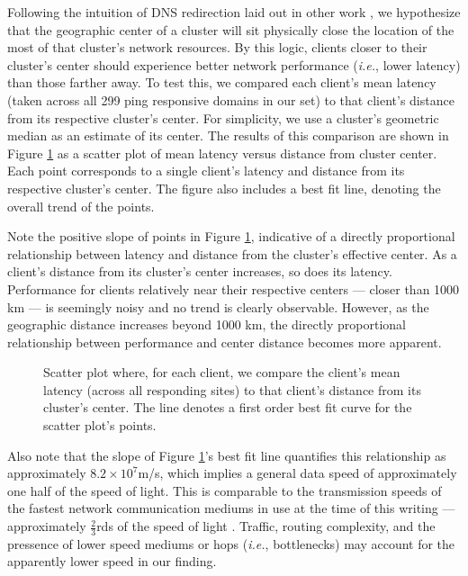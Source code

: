 \begin{figure*}
    \caption{Map of world with point for each cluster's geographic center.}
    \label{centerlocs}
\end{figure*}


Following the intuition of DNS redirection laid out in other work
\cite{Calder2013,exploringedns,benchaita2016stability}, we hypothesize that the
geographic center of a cluster will sit physically close the location of the
most of that cluster's network resources. By this logic, clients closer to
their cluster's center should experience better network performance
(\emph{i.e.}, lower latency) than those farther away. To test this, we compared
each client's mean latency (taken across all 299 ping responsive domains in our
set) to that client's distance from its respective cluster's center. For
simplicity, we use a cluster's geometric median as an estimate of its center.
The results of this comparison are shown in Figure \ref{geoperf} as a scatter
plot of mean latency versus distance from cluster center. Each point
corresponds to a single client's latency and distance from its respective
cluster's center.  The figure also includes a best fit line, denoting the
overall trend of the points. 

Note the positive slope of points in Figure \ref{geoperf}, indicative of a
directly proportional relationship between latency and distance from the
cluster's effective center. As a client's distance from its cluster's center
increases, so does its latency. Performance for clients relatively near their
respective centers --- closer than 1000 km --- is seemingly noisy and no trend
is clearly observable.  However, as the geographic distance increases beyond
1000 km, the directly proportional relationship between performance and center
distance becomes more apparent. 

\begin{figure}
    \caption{Scatter plot where, for each client, we compare the client's mean latency
    (across all responding sites) to that client's distance from its cluster's
    center. The line denotes a first order best fit curve for the scatter plot's points.}
    \label{geoperf}
\end{figure}

Also note that the slope of Figure \ref{geoperf}'s best fit line
quantifies this relationship as approximately
$8.2\times10^{7}$m/s, which implies a general data speed of
approximately one half of the speed of light. This is comparable to the transmission speeds of the fastest network communication mediums in use at the
time of this writing --- approximately $\frac{2}{3}$rds of the speed of
light \cite{gueye2006constraint,speedoflight}. Traffic, routing complexity, and the pressence of lower speed
mediums or hops (\emph{i.e.}, bottlenecks) may account for the apparently lower speed in our finding.



